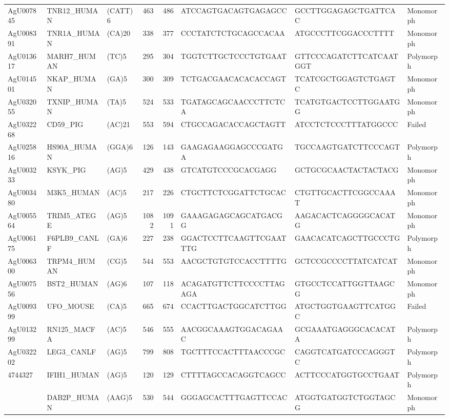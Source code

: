 \documentclass[]{article}
\begin{document}
\begin{longtable}[t]{lllrrlll}
AgU007845 & TNR12\_HUMAN & (CATT)6 & 463 & 486 & ATCCAGTGACAGTGAGAGCC & GCCTTGGAGAGCTGATTCAC & Monomorph\\
AgU008391 & TNR1A\_HUMAN & (CA)20 & 338 & 377 & CCCTATCTCTGCAGCCACAA & ATGCCCTTCGGACCCTTTT & Monomorph\\
\addlinespace
AgU013617 & MARH7\_HUMAN & (TC)5 & 295 & 304 & TGGTCTTGCTCCCTGTGAAT & GTTCCCAGATCTTCATCAATGGT & Polymorph\\
AgU014501 & NKAP\_HUMAN & (GA)5 & 300 & 309 & TCTGACGAACACACACCAGT & TCATCGCTGGAGTCTGAGTC & Monomorph\\
AgU032055 & TXNIP\_HUMAN & (TA)5 & 524 & 533 & TGATAGCAGCAACCCTTCTCA & TCATGTGACTCCTTGGAATGG & Monomorph\\
AgU032268 & CD59\_PIG & (AC)21 & 553 & 594 & CTGCCAGACACCAGCTAGTT & ATCCTCTCCCTTTATGGCCC & Failed\\
AgU025816 & HS90A\_HUMAN & (GGA)6 & 126 & 143 & GAAGAGAAGGAGCCCGATGA & TGCCAAGTGATCTTCCCAGT & Polymorph\\
\addlinespace
AgU003233 & KSYK\_PIG & (AG)5 & 429 & 438 & GTCATGTCCCGCACGAGG & GCTGCGCAACTACTACTACG & Monomorph\\
AgU003480 & M3K5\_HUMAN & (AC)5 & 217 & 226 & CTGCTTCTCGGATTCTGCAC & CTGTTGCACTTCGGCCAAAT & Monomorph\\
AgU005564 & TRIM5\_ATEGE & (AG)5 & 1082 & 1091 & GAAAGAGAGCAGCATGACGG & AAGACACTCAGGGGCACATG & Monomorph\\
AgU006175 & F6PLB9\_CANLF & (GA)6 & 227 & 238 & GGACTCCTTCAAGTTCGAATTTG & GAACACATCAGCTTGCCCTG & Polymorph\\
AgU006300 & TRPM4\_HUMAN & (CG)5 & 544 & 553 & AACGCTGTGTCCACCTTTTG & GCTCCGCCCCTTATCATCAT & Monomorph\\
\addlinespace
AgU007556 & BST2\_HUMAN & (AG)6 & 107 & 118 & ACAGATGTTCTTCCCCTTAGAGA & GTGCCTCCATTGGTTAAGCG & Monomorph\\
AgU009399 & UFO\_MOUSE & (CA)5 & 665 & 674 & CCACTTGACTGGCATCTTGG & ATGCTGGTGAAGTTCATGGC & Failed\\
AgU013299 & RN125\_MACFA & (AC)5 & 546 & 555 & AACGGCAAAGTGGACAGAAC & GCGAAATGAGGGCACACATA & Polymorph\\
AgU032202 & LEG3\_CANLF & (AG)5 & 799 & 808 & TGCTTTCCACTTTAACCCGC & CAGGTCATGATCCCAGGGTC & Polymorph\\
4744327 & IFIH1\_HUMAN & (AG)5 & 120 & 129 & CTTTTAGCCACAGGTCAGCC & ACTTCCCATGGTGCCTGAAT & Polymorph\\
\addlinespace
4750387 & DAB2P\_HUMAN & (AAG)5 & 530 & 544 & GGGAGCACTTTGAGTTCCAC & ATGGTGATGGTCTGGTAGCG & Monomorph\\

\end{longtable}
\end{document}

